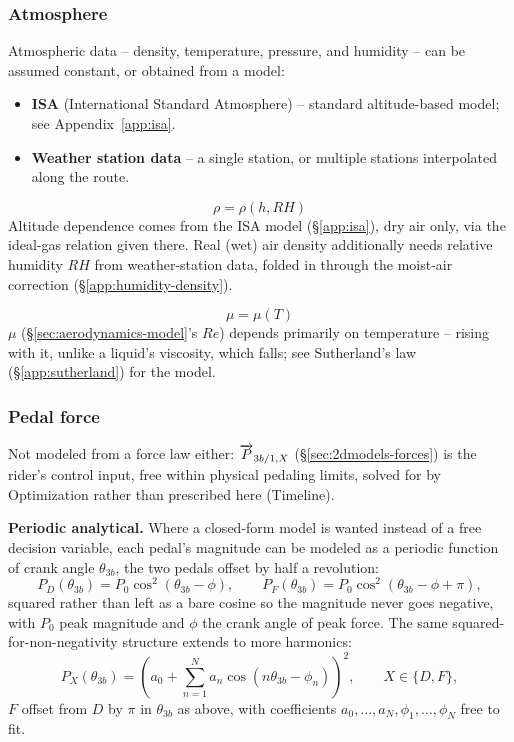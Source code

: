 \subsubsection{Atmosphere}
Atmospheric data -- density, temperature, pressure, and humidity -- can be assumed constant, or obtained from a model:
\begin{itemize}
    \item \textbf{ISA} (International Standard Atmosphere) -- standard altitude-based model; see Appendix~\ref{app:isa}.
    \item \textbf{Weather station data} -- a single station, or multiple stations interpolated along the route.
\end{itemize}

\label{sec:air-density}
\begin{equation}
    \rho = \rho(h, RH)
\end{equation}
Altitude dependence comes from the ISA model (\S\ref{app:isa}), dry air only, via the ideal-gas relation given there. Real (wet) air density additionally needs relative humidity $RH$ from weather-station data, folded in through the moist-air correction (\S\ref{app:humidity-density}).

\label{sec:air-viscosity}
\begin{equation}
    \mu = \mu(T)
\end{equation}
$\mu$ (\S\ref{sec:aerodynamics-model}'s $Re$) depends primarily on temperature -- rising with it, unlike a liquid's viscosity, which falls; see Sutherland's law (\S\ref{app:sutherland}) for the model.

\subsubsection{Pedal force}
\label{sec:pedal-force-model}
Not modeled from a force law either: $\overrightarrow{P}_{3b/1,X}$ (\S\ref{sec:2dmodels-forces}) is the rider's control input, free within physical pedaling limits, solved for by Optimization rather than prescribed here (Timeline).

\textbf{Periodic analytical.} Where a closed-form model is wanted instead of a free decision variable, each pedal's magnitude can be modeled as a periodic function of crank angle $\theta_{3b}$, the two pedals offset by half a revolution:
\begin{equation}
    P_D(\theta_{3b}) = P_0\cos^2(\theta_{3b}-\phi), \qquad P_F(\theta_{3b}) = P_0\cos^2(\theta_{3b}-\phi+\pi),
\end{equation}
squared rather than left as a bare cosine so the magnitude never goes negative, with $P_0$ peak magnitude and $\phi$ the crank angle of peak force. The same squared-for-non-negativity structure extends to more harmonics:
\begin{equation}
    P_X(\theta_{3b}) = \left(a_0 + \sum_{n=1}^N a_n\cos(n\theta_{3b}-\phi_n)\right)^2, \qquad X\in\{D,F\},
\end{equation}
$F$ offset from $D$ by $\pi$ in $\theta_{3b}$ as above, with coefficients $a_0,\dots,a_N,\phi_1,\dots,\phi_N$ free to fit.

